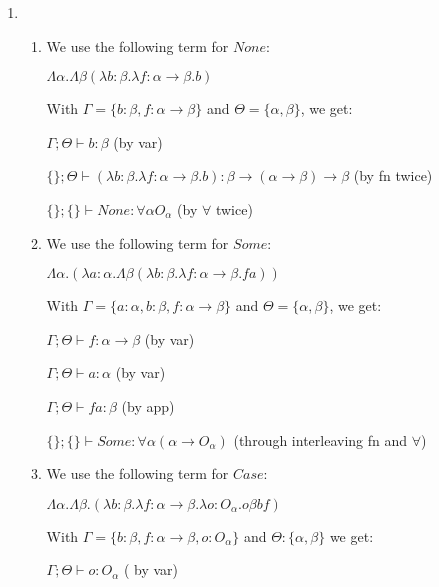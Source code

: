 


\begin{enumerate}[label=(\alph*)]
  \item
    \begin{enumerate}[label=(\roman*)]
      \item

        We use the following term for $None$:

        $\Lambda \alpha. \Lambda \beta (\lambda b : \beta. \lambda f : \alpha \rightarrow \beta. b)$

        With $\Gamma = \{b : \beta, f : \alpha \rightarrow \beta\}$ and $\Theta = \{\alpha, \beta\}$, we get:

        $\Gamma ; \Theta \vdash b : \beta$ (by var)

        $\{\} ; \Theta \vdash (\lambda b : \beta. \lambda f : \alpha \rightarrow \beta . b) : \beta \rightarrow (\alpha \rightarrow \beta) \rightarrow \beta$ (by fn twice)

        $\{\} ; \{\} \vdash None : \forall \alpha O_\alpha$ (by $\forall$ twice)

      \item
        We use the following term for $Some$:

        $\Lambda \alpha. (\lambda a: \alpha. \Lambda \beta (\lambda b : \beta. \lambda f : \alpha \rightarrow \beta. f a))$

        With $\Gamma = \{a: \alpha, b : \beta, f : \alpha \rightarrow \beta\}$ and $\Theta = \{\alpha, \beta\}$, we get:

        $\Gamma ; \Theta \vdash f : \alpha \rightarrow \beta$ (by var)

        $\Gamma ; \Theta \vdash a : \alpha$ (by var)

        $\Gamma ; \Theta \vdash f a : \beta$ (by app)

        $\{\} ; \{\} \vdash Some : \forall \alpha (\alpha \rightarrow O_\alpha)$ (through interleaving fn and $\forall$)


      \item
        We use the following term for $Case$:

        $\Lambda \alpha. \Lambda \beta. (\lambda b : \beta. \lambda f : \alpha \rightarrow \beta. \lambda o : O_\alpha. o \beta b f)$

        With $\Gamma = \{b : \beta, f : \alpha \rightarrow \beta, o : O_\alpha\}$ and $\Theta : \{\alpha, \beta\}$ we get:

        $\Gamma ; \Theta \vdash o : O_\alpha$ ( by var)


\end{enumerate}
\end{enumerate}
